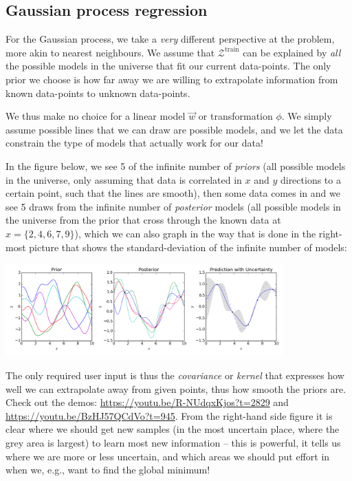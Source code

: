\documentclass{article}
\begin{document}
\subsection{Gaussian process regression}
For the Gaussian process, we take a \textit{very} different perspective at the problem, more akin to nearest neighbours. We assume that $\mathcal{Z}^\text{train}$ can be explained by \textit{all} the possible models in the universe that fit our current data-points. The only prior we choose is how far away we are willing to extrapolate information from known data-points to unknown data-points.

We thus make no choice for a linear model $\vec{w}$ or transformation $\phi$. We simply assume  possible lines that we can draw are possible models, and we let the data constrain the type of models that actually work for our data!
\begin{testexample}
    In the figure below, we see 5 of the infinite number of \textit{priors} (all possible models in the universe, only assuming that data is correlated in $x$ and $y$ directions to a certain point, such that the lines are smooth), then some data comes in and we see 5 draws from the infinite number of \textit{posterior} models (all possible models in the universe from the prior that cross through the known data at $x=\{2,4,6,7,9\}$), which we can also graph in the way that is done in the right-most picture that shows the standard-deviation of the infinite number of models:
    \begin{center}\includegraphics[width=0.8\textwidth]{Gaussian_Process_Regression.png}\end{center}
    {\flushleft The} only required user input is thus the \textit{covariance} or \textit{kernel} that expresses how well we can extrapolate away from given points, thus how smooth the priors are. Check out the demos: \url{https://youtu.be/R-NUdqxKjos?t=2829} and  \url{https://youtu.be/BzHJ57QCdVo?t=945}. From the right-hand side figure it is clear where we should get new samples (in the most uncertain place, where the grey area is largest) to learn most new information -- this is powerful, it tells us where we are more or less uncertain, and which areas we should put effort in when we, e.g., want to find the global minimum!
\end{testexample}
\end{document}
